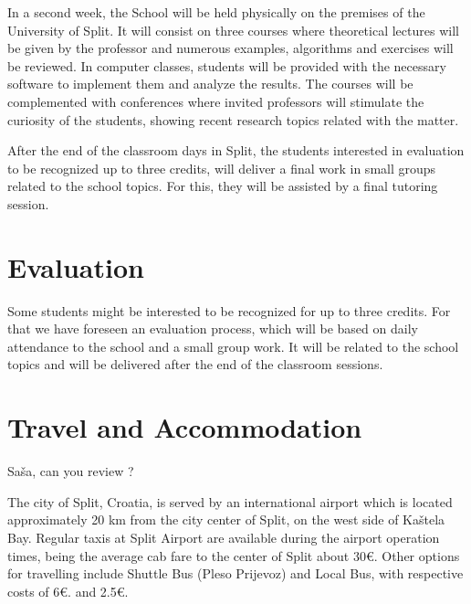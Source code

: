 \documentclass[letterpaper]{inzane_syllabus} %
\begin{document}
In a second week, the School will be held physically on the premises of the University of Split. It will consist on three courses where  theoretical lectures will be given by the professor and numerous examples, algorithms and exercises will be reviewed. In computer classes, students will be provided with the necessary software to implement them and analyze the results. The courses will be complemented with conferences where invited professors will stimulate the curiosity of the students, showing recent research topics related with the matter.

After the end of the classroom days in Split, the students interested in evaluation to be recognized up to three credits, will deliver a final work in small groups related to the school topics. For this, they will be assisted by a final tutoring session.


\newpage %

\makeSide %



\section{Evaluation}

Some students might be interested to be recognized for up to three credits. For that we have foreseen an evaluation process, which will be based on daily attendance to the school and  a small group work. It will be related to the school topics and will be delivered after the end of the classroom sessions.


\vspace{0.5cm}
\section{Travel and Accommodation}

{\color{myCOLOR}Sa\v sa, can you review ?}

The city of Split, Croatia, is served by an international airport which is located approximately 20 km from the city center of Split, on the west side of Kaštela Bay. Regular taxis at Split Airport are available during the airport operation times, being the average cab fare to the center of Split about 30\euro. Other options for travelling include Shuttle Bus (Pleso Prijevoz) and Local Bus, with respective costs of 6\euro. and 2.5\euro. 
\end{document}

